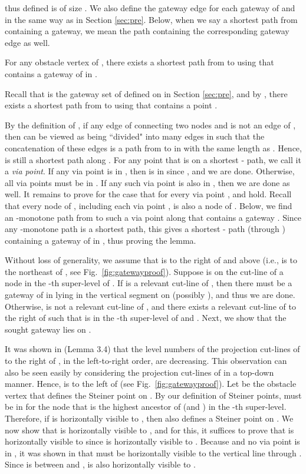 \documentclass[english,runningheads,11pt]{llncs}
\newenvironment{proof}{\noindent {\textbf{Proof:}}\rm}{\hfill \rm}
\begin{document}
 thus defined is of size
. We also define the gateway edge for
each gateway of  and  in the same way as in Section \ref{sec:pre}.
Below, when we say a shortest path from  containing a gateway, we
mean the path containing the corresponding gateway edge as well.

\begin{lemma}\label{lem:20}
For any obstacle vertex  of , there exists a shortest path
from  to  using  that contains a gateway of  in .
\end{lemma}
\begin{proof}
Recall that  is the gateway set of  defined on
 in Section \ref{sec:pre}, and by \cite{ref:ChenSh00}, there exists a
shortest path  from  to  using 
that contains a point .

By the definition of , if any edge  of  connecting two nodes  and  is not an edge of , then 
can be viewed as being ``divided" into many edges in  such that the concatenation
of these edges is a path from  to  in  with the same length
as . Hence,  is still a shortest path
along .
For any point  that is on a shortest - path, we call
it a {\it via point}.
If any via point  is in , then  is in 
since , and we are done.
Otherwise, all via points must be in . If any such via point  is also in
, then we are done as well. It remains to prove for the
case that for every via point ,  and  hold. Recall that every node of , including each via point
, is also a node of .
Below, we find an -monotone path from  to such a via point  along  that
contains a gateway . Since any -monotone path
is a shortest path, this gives a shortest - path (through )
containing a gateway  of  in , thus proving the lemma.

Without loss of generality, we assume that  is to the right of  and
above  (i.e.,  is to the northeast of , see
Fig.~\ref{fig:gatewayproof}). Suppose  is on the cut-line  of a node  in
the -th super-level of .
If  is a relevant cut-line of , then there must be a gateway  of  in 
lying in the vertical segment  on  (possibly ), and thus
we are done.  Otherwise,  is not a relevant cut-line of , and
there exists a relevant cut-line  of 
to the right of  such that  is in the -th super-level of 
and .
Next, we show that the sought gateway  lies on .

It was shown in \cite{ref:ChenSh00} (Lemma 3.4) that the level numbers of the
projection cut-lines of  to the right of ,
in the left-to-right order, are decreasing.
This observation can also be seen easily by considering the projection cut-lines of  in a top-down manner. Hence,
 is to the left of  (see Fig.~\ref{fig:gatewayproof}). Let  be the obstacle vertex that
defines the Steiner point  on . By our definition of
Steiner points,  must be in  for the
node  that is the highest ancestor of  (and ) in the -th
super-level. Therefore, if  is horizontally visible to
, then  also defines a Steiner point on . We now show
that  is horizontally visible to , and for this,
it suffices to prove
that  is horizontally visible to  since  is horizontally visible to .
Because  and no via point is in ,
it was shown in \cite{ref:ChenSh00} that
 must be horizontally visible to the vertical line through . Since
 is between  and ,  is also horizontally
visible to .


\end{proof}
\end{document}
